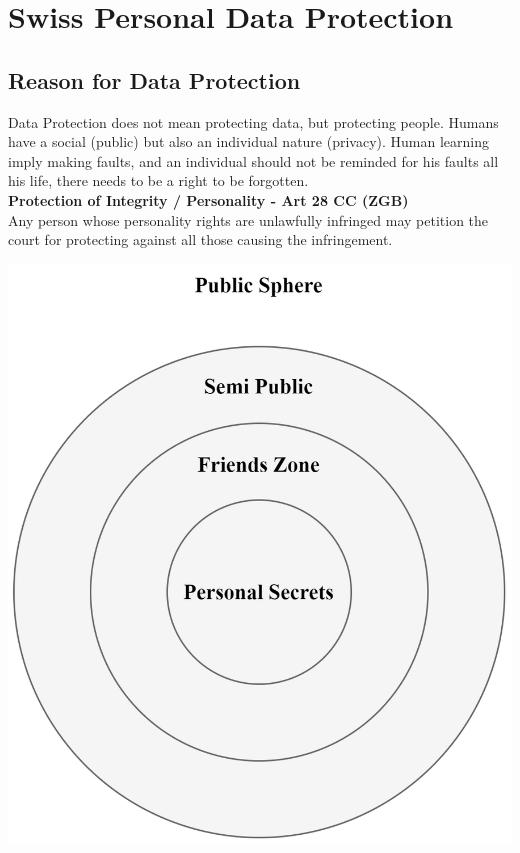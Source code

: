 \documentclass[11pt]{article}
\theoremstyle{definition}
\begin{document}
\section{Swiss Personal Data Protection}

\subsection{Reason for Data Protection}
\begin{minipage}{0.6\linewidth}
	Data Protection does not mean protecting data, but protecting people. Humans have a social (public) but also an individual nature (privacy). Human learning imply making faults, and an individual should not be reminded for his faults all his life, there needs to be a right to be forgotten.\\
	
	\vspace{1em}
	\noindent
	\textbf{Protection of Integrity / Personality - Art 28 CC (ZGB)} \\
	\noindent
	Any person whose personality rights are unlawfully infringed may petition the court for protecting against all those causing the infringement.
\end{minipage}
\begin{minipage}{0.4\linewidth}
	\begin{center}
		\includegraphics[width=0.8\linewidth]{img/spheres.png}
	\end{center}
\end{minipage}
\end{document}
